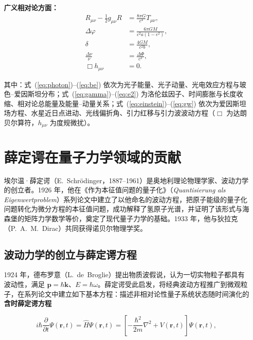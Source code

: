 \documentclass{ctexart} %
\begin{document}
\noindent\textbf{广义相对论方面：}
\begin{align}
    R_{\mu\nu} - \tfrac{1}{2}g_{\mu\nu}R &= \frac{8\pi G}{c^4}T_{\mu\nu}, \label{eq:einstein}\\
    \Delta\varphi &= \frac{6\pi GM}{c^2 a(1 - e^2)}, \label{eq:perihelion}\\
    \delta &= \frac{4GM}{c^2 b}, \label{eq:bending}\\
    \frac{\Delta\nu}{\nu} &= \frac{\Delta\Phi}{c^2}, \label{eq:redshift}\\
    \Box h_{\mu\nu} &= 0. \label{eq:gw}
\end{align}

其中：式~(\ref{eq:photon})--(\ref{eq:be}) 依次为光子能量、光子动量、光电效应方程与玻色--爱因斯坦分布；式~(\ref{eq:gamma})--(\ref{eq:e2}) 为洛伦兹因子、时间膨胀与长度收缩、相对论总能量及能量--动量关系；式~(\ref{eq:einstein})--(\ref{eq:gw}) 依次为爱因斯坦场方程、水星近日点进动、光线偏折角、引力红移与引力波波动方程（$\Box$ 为达朗贝尔算符，$h_{\mu\nu}$ 为度规微扰）。

\section{薛定谔在量子力学领域的贡献}

埃尔温·薛定谔（E.~Schr{\"o}dinger，1887--1961）是奥地利理论物理学家、波动力学的创立者。1926 年，他在《作为本征值问题的量子化》（\textit{Quantisierung als Eigenwertproblem}）系列论文中建立了以他命名的波动方程，把原子能级的量子化问题转化为微分方程的本征值问题，成功解释了氢原子光谱，并证明了该形式与海森堡的矩阵力学数学等价，奠定了现代量子力学的基础。1933 年，他与狄拉克（P.~A.~M.~Dirac）共同获得诺贝尔物理学奖。

\subsection*{波动力学的创立与薛定谔方程}

1924 年，德布罗意（L.~de~Broglie）提出物质波假说，认为一切实物粒子都具有波动性，满足 $\mathbf{p} = \hbar\mathbf{k}$、$E = \hbar\omega$。薛定谔受此启发，将经典波动方程推广到微观粒子，在系列论文中建立如下基本方程\cite{schrodinger1926}：描述非相对论性量子系统状态随时间演化的\textbf{含时薛定谔方程}

\begin{equation}
    i\hbar\frac{\partial}{\partial t}\Psi(\mathbf{r},t) = \hat{H}\Psi(\mathbf{r},t)
    = \left[-\frac{\hbar^2}{2m}\nabla^2 + V(\mathbf{r},t)\right]\Psi(\mathbf{r},t),
    \label{eq:tdse}
\end{equation}
\end{document}
